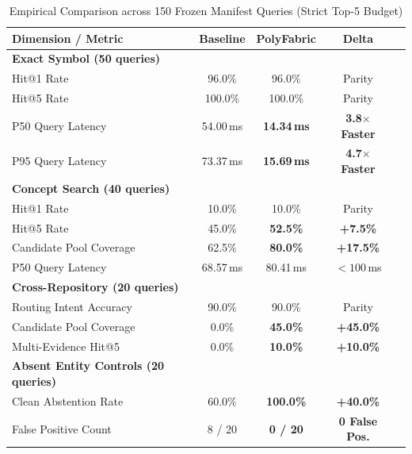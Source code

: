 \documentclass[10pt,journal,compsoc]{IEEEtran}
\begin{document}
\begin{table}[!t]
\centering
\caption{Empirical Comparison across 150 Frozen Manifest Queries (Strict Top-5 Budget)}
\label{tab:results}
\begin{tabular}{lcccc}
\toprule
\textbf{Dimension / Metric} & \textbf{Baseline} & \textbf{PolyFabric} & \textbf{Delta} \\
\midrule
\textbf{Exact Symbol (50 queries)} & & & \\
Hit@1 Rate & 96.0\% & 96.0\% & Parity \\
Hit@5 Rate & 100.0\% & 100.0\% & Parity \\
P50 Query Latency & 54.00\,ms & \textbf{14.34\,ms} & \textbf{3.8$\times$ Faster} \\
P95 Query Latency & 73.37\,ms & \textbf{15.69\,ms} & \textbf{4.7$\times$ Faster} \\
\midrule
\textbf{Concept Search (40 queries)} & & & \\
Hit@1 Rate & 10.0\% & 10.0\% & Parity \\
Hit@5 Rate & 45.0\% & \textbf{52.5\%} & \textbf{+7.5\%} \\
Candidate Pool Coverage & 62.5\% & \textbf{80.0\%} & \textbf{+17.5\%} \\
P50 Query Latency & 68.57\,ms & 80.41\,ms & $<100$\,ms \\
\midrule
\textbf{Cross-Repository (20 queries)} & & & \\
Routing Intent Accuracy & 90.0\% & 90.0\% & Parity \\
Candidate Pool Coverage & 0.0\% & \textbf{45.0\%} & \textbf{+45.0\%} \\
Multi-Evidence Hit@5 & 0.0\% & \textbf{10.0\%} & \textbf{+10.0\%} \\
\midrule
\textbf{Absent Entity Controls (20 queries)} & & & \\
Clean Abstention Rate & 60.0\% & \textbf{100.0\%} & \textbf{+40.0\%} \\
False Positive Count & 8 / 20 & \textbf{0 / 20} & \textbf{0 False Pos.} \\
\bottomrule
\end{tabular}
\end{table}
\end{document}
